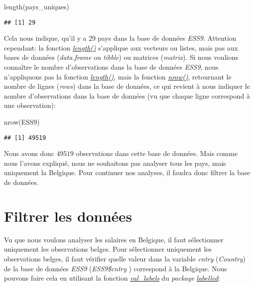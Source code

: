 \documentclass[
]{book}
\newenvironment{Shaded}{\begin{snugshade}}{\end{snugshade}}
\newcommand{\FunctionTok}[1]{\textcolor[rgb]{0.00,0.00,0.00}{#1}}
\newcommand{\NormalTok}[1]{#1}
\begin{document}
\begin{Shaded}
\begin{Highlighting}[]
\FunctionTok{length}\NormalTok{(pays\_uniques)}
\end{Highlighting}
\end{Shaded}

\begin{verbatim}
## [1] 29
\end{verbatim}

Cela nous indique, qu'il y a 29 pays dans la base de données \emph{ESS9}. Attention cependant: la fonction \emph{\href{https://www.rdocumentation.org/packages/base/versions/3.6.2/topics/length}{length()}} s'applique aux vecteurs ou listes, mais pas aux bases de données (\emph{data.frame} ou \emph{tibble}) ou matrices (\emph{matrix}). Si nous voulions connaître le nombre d'observations dans la base de données \emph{ESS9}, nous n'appliquons pas la fonction \emph{\href{https://www.rdocumentation.org/packages/base/versions/3.6.2/topics/length}{length()}}, mais la fonction \href{https://www.rdocumentation.org/packages/base/versions/3.6.2/topics/nrow}{\emph{nrow()}}, retournant le nombre de lignes (\emph{rows}) dans la base de données, ce qui revient à nous indiquer le nombre d'observations dans la base de données (vu que chaque ligne correspond à une observation):

\begin{Shaded}
\begin{Highlighting}[]
\FunctionTok{nrow}\NormalTok{(ESS9)}
\end{Highlighting}
\end{Shaded}

\begin{verbatim}
## [1] 49519
\end{verbatim}

Nous avons donc \(49519\) observations dans cette base de données. Mais comme nous l'avons expliqué, nous ne souhaitons pas analyser tous les pays, mais uniquement la Belgique. Pour continuer nos analyses, il faudra donc filtrer la base de données.

\hypertarget{filtrer-les-donnuxe9es}{%
\section{Filtrer les données}\label{filtrer-les-donnuxe9es}}

Vu que nous voulons analyser les salaires en Belgique, il faut sélectionner uniquement les observations belges. Pour sélectionner uniquement les observations belges, il faut vérifier quelle valeur dans la variable \emph{cntry} (\emph{Country}) de la base de données \emph{ESS9} (\emph{ESS9\$cntry} ) correspond à la Belgique. Nous pouvons faire cela en utilisant la fonction \href{https://www.rdocumentation.org/packages/labelled/versions/2.10.0/topics/val_labels}{\emph{val\_labels}} du \emph{package} \href{https://cran.r-project.org/web/packages/labelled/vignettes/intro_labelled.html}{\emph{labelled}}:
\end{document}
